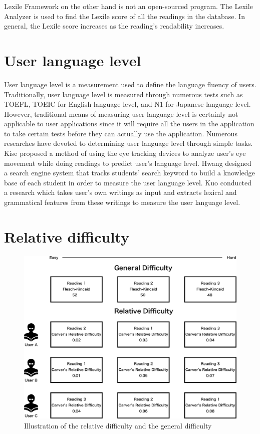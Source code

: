 Lexile Framework on the other hand is not an open-sourced program. The Lexile Analyzer \cite{LexileAnalyzer} is used to find the Lexile score of all the readings in the database. In general, the Lexile score increases as the reading's readability increases.

\section{User language level}

User language level is a measurement used to define the language fluency of users. Traditionally, user language level is measured through numerous tests such as TOEFL, TOEIC for English language level, and N1 for Japanese language level. However, traditional means of measuring user language level is certainly not applicable to user applications since it will require all the users in the application to take certain tests before they can actually use the application. Numerous researches have devoted to determining user language level through simple tasks. Kise \cite{Yoshimura2015} proposed a method of using the eye tracking devices to analyze user's eye movement while doing readings to predict user's language level. Hwang \cite{Hwang2008, Hwang2010} designed a search engine system that tracks students' search keyword to build a knowledge base of each student in order to measure the user language level. Kuo \cite{Kuo2014} conducted a research which takes user's own writings as input and extracts lexical and grammatical features from these writings to measure the user language level.

\section{Relative difficulty}

\begin{figure}[tbp]
 \begin{center}
  \includegraphics[width=120mm]{relative_vs_general.eps}
 \end{center}
 \caption{\label{figure:relative_vs_general} Illustration of the relative difficulty and the general difficulty}
\end{figure}

